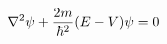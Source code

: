 \documentclass[preview]{standalone}
\begin{document}
\begin{align*}
\special{dvisvgm:raw <g id='unique000'>}\nabla^2 \psi + \frac{2m}{\hbar^2}(E-V)\psi = 0\special{dvisvgm:raw </g>}
\end{align*}
\end{document}
